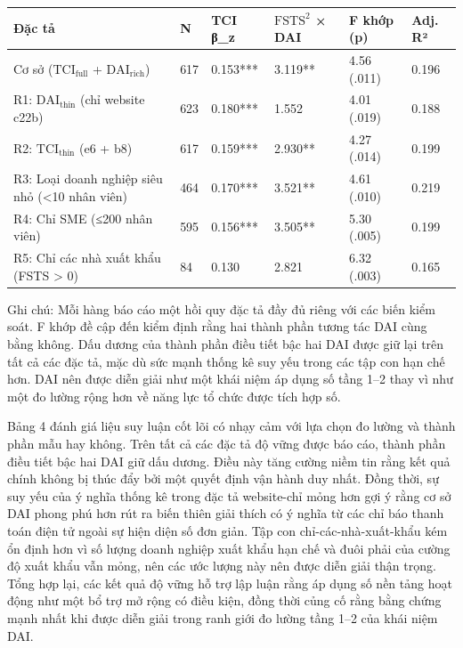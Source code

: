 \documentclass[12pt,a4paper]{article}
\begin{document}
\begin{longtable}[]{@{}llllll@{}}
\toprule\noalign{}
Đặc tả & N & TCI β\_z & \(\mathrm{FSTS}^2\) × DAI & F khớp (p) & Adj.
R² \\
\midrule\noalign{}
\endhead
\bottomrule\noalign{}
\endlastfoot
Cơ sở (\(\mathrm{TCI}_{\text{full}}\) + \(\mathrm{DAI}_{\text{rich}}\))
& 617 & 0.153*** & 3.119** & 4.56 (.011) & 0.196 \\
R1: \(\mathrm{DAI}_{\text{thin}}\) (chỉ website c22b) & 623 & 0.180*** &
1.552 & 4.01 (.019) & 0.188 \\
R2: \(\mathrm{TCI}_{\text{thin}}\) (e6 + b8) & 617 & 0.159*** & 2.930**
& 4.27 (.014) & 0.199 \\
R3: Loại doanh nghiệp siêu nhỏ (\textless10 nhân viên) & 464 & 0.170***
& 3.521** & 4.61 (.010) & 0.219 \\
R4: Chỉ SME (≤200 nhân viên) & 595 & 0.156*** & 3.505** & 5.30 (.005) &
0.199 \\
R5: Chỉ các nhà xuất khẩu (FSTS \textgreater{} 0) & 84 & 0.130 & 2.821 &
6.32 (.003) & 0.165 \\
\end{longtable}

Ghi chú: Mỗi hàng báo cáo một hồi quy đặc tả đầy đủ riêng với các biến
kiểm soát. F khớp đề cập đến kiểm định rằng hai thành phần tương tác DAI
cùng bằng không. Dấu dương của thành phần điều tiết bậc hai DAI được giữ
lại trên tất cả các đặc tả, mặc dù sức mạnh thống kê suy yếu trong các
tập con hạn chế hơn. DAI nên được diễn giải như một khái niệm áp dụng số
tầng 1--2 thay vì như một đo lường rộng hơn về năng lực tổ chức được
tích hợp số.

Bảng 4 đánh giá liệu suy luận cốt lõi có nhạy cảm với lựa chọn đo lường
và thành phần mẫu hay không. Trên tất cả các đặc tả độ vững được báo
cáo, thành phần điều tiết bậc hai DAI giữ dấu dương. Điều này tăng cường
niềm tin rằng kết quả chính không bị thúc đẩy bởi một quyết định vận
hành duy nhất. Đồng thời, sự suy yếu của ý nghĩa thống kê trong đặc tả
website-chỉ mỏng hơn gợi ý rằng cơ sở DAI phong phú hơn rút ra biến
thiên giải thích có ý nghĩa từ các chỉ báo thanh toán điện tử ngoài sự
hiện diện số đơn giản. Tập con chỉ-các-nhà-xuất-khẩu kém ổn định hơn vì
số lượng doanh nghiệp xuất khẩu hạn chế và đuôi phải của cường độ xuất
khẩu vẫn mỏng, nên các ước lượng này nên được diễn giải thận trọng. Tổng
hợp lại, các kết quả độ vững hỗ trợ lập luận rằng áp dụng số nền tảng
hoạt động như một bổ trợ mở rộng có điều kiện, đồng thời củng cố rằng
bằng chứng mạnh nhất khi được diễn giải trong ranh giới đo lường tầng
1--2 của khái niệm DAI.
\end{document}
